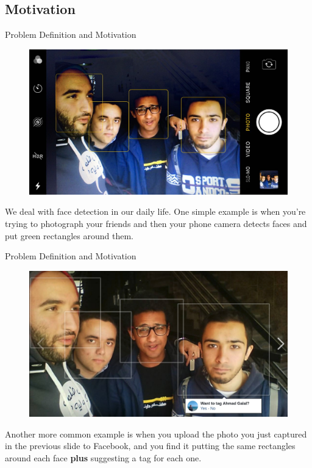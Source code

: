 \documentclass[10pt]{beamer}
\begin{document}
\subsection{Motivation}
\begin{frame}{Problem Definition and Motivation}

\begin{figure}
\vspace*{0cm}
\hspace*{0cm}
\includegraphics[scale=0.15]{images/camera}
\end{figure}

We deal with face detection in our daily life. One simple example is when you're trying to photograph your friends and then your phone camera detects faces and put green rectangles around them.
\end{frame}


\begin{frame}{Problem Definition and Motivation}

\begin{figure}
\vspace*{0cm}
\hspace*{0cm}
\includegraphics[scale=0.15]{images/modMen}
\end{figure}

Another more common example is when you upload the photo you just captured in the previous slide to Facebook, and you find it putting the same rectangles around each face \textbf{plus} suggesting a tag for each one.
\end{frame}
\end{document}
